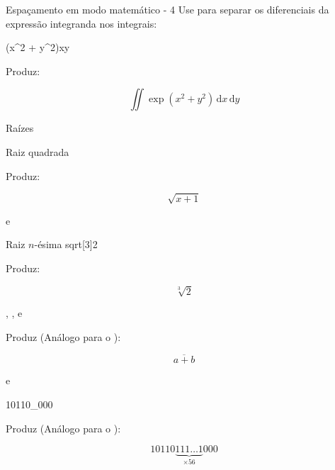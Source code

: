 \begin{frame}{Espaçamento em modo matemático - 4}
	Use \LCmd{,} para separar os diferenciais da expressão integranda nos integrais:

	\begin{Codigo}{}
		\LCmd{[}
		(x\string^2 + y\string^2)\LCmd{,}x\LCmd{,}y
		\LCmd{]}
	\end{Codigo}

    \pause
	Produz:

	\begin{Resultado}{}
		\[
		\iint\exp (x^2 + y^2) \,\mathrm{d}x \,\mathrm{d}y
		\]
	\end{Resultado}
\end{frame}

\begin{frame}{Raízes}
	\begin{Codigo}{Raiz quadrada}
	\end{Codigo}

    \pause
	Produz:

	\begin{Resultado}{}
		\[\sqrt{x+1}\]
	\end{Resultado}

    \pause
	e

	\begin{Codigo}{Raiz $n$-ésima}
		\LOA sqrt[3]{2}
	\end{Codigo}

    \pause
	Produz:
	
	\begin{Resultado}{}
		\[\sqrt[3]{2}\]
	\end{Resultado}
\end{frame}

\begin{frame}{, ,  e }
	\begin{Codigo}{}
	\end{Codigo}

	Produz (Análogo para o ): 
	
	\begin{Resultado}{}
		\[\overline{a+b}\]
	\end{Resultado}

    \pause
	e

	\begin{Codigo}{}
		10110\string_000
	\end{Codigo}

    \pause
	Produz (Análogo para o ):

	\begin{Resultado}{}
		\[10110\underbrace{111\dots1}_{\times 56}000\]
	\end{Resultado}
\end{frame}

